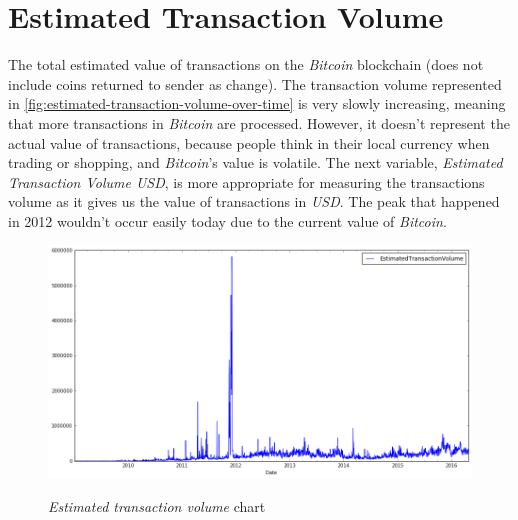 
\section{Estimated Transaction Volume}
\label{sec:estimated-transaction-volume}


The total estimated value of transactions on the \textit{Bitcoin}
blockchain (does not include coins returned to sender as change). The
transaction volume represented in
\autoref{fig:estimated-transaction-volume-over-time} is very slowly
increasing, meaning that more transactions in \textit{Bitcoin} are
processed. However, it doesn't represent the actual value of
transactions, because people think in their local currency when
trading or shopping, and \textit{Bitcoin}'s value is volatile. The
next variable, \textit{Estimated Transaction Volume USD}, is more
appropriate for measuring the transactions volume as it gives us the
value of transactions in \textit{USD}. The peak that happened in 2012
wouldn't occur easily today due to the current value of
\textit{Bitcoin}.

\begin{figure}[bth]
  \myfloatalign
  {\includegraphics[width=1\linewidth]
    {gfx/estimated-transaction-volume-over-time}}
  \caption{\textit{Estimated transaction volume} chart}
  \label{fig:estimated-transaction-volume-over-time}
\end{figure}




